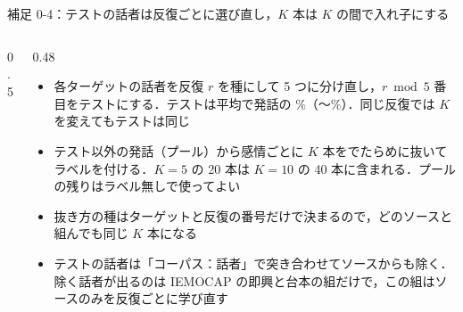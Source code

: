 \begin{frame}{補足 0-4：テストの話者は反復ごとに選び直し，$K$ 本は $K$ の間で入れ子にする}
\begin{columns}[T,onlytextwidth]
\begin{column}{0.5\textwidth}
    \end{column}
    \begin{column}{0.48\textwidth}
      \begin{itemize}\scriptsize\setlength{\itemsep}{4pt}
        \item 各ターゲットの話者を反復 $r$ を種にして 5 つに分け直し，$r \bmod 5$ 番目をテストにする．テストは平均で発話の \%（〜\%）．同じ反復では $K$ を変えてもテストは同じ
        \item テスト以外の発話（プール）から感情ごとに $K$ 本をでたらめに抜いてラベルを付ける．$K=5$ の 20 本は $K=10$ の 40 本に含まれる．プールの残りはラベル無しで使ってよい
        \item 抜き方の種はターゲットと反復の番号だけで決まるので，どのソースと組んでも同じ $K$ 本になる
        \item テストの話者は「コーパス：話者」で突き合わせてソースからも除く．除く話者が出るのは IEMOCAP の即興と台本の組だけで，この組はソースのみを反復ごとに学び直す
      \end{itemize}
    \end{column}
  \end{columns}
\end{frame}

